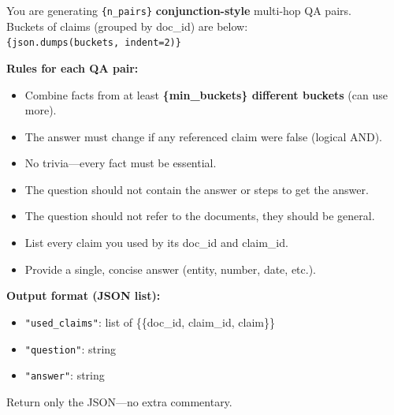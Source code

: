 \begin{tcolorbox}[
    colback=lightgray!20, 
    colframe=gray, 
    title={\textbf{Conjunction-Style Multi-Hop QA Prompt}}, 
    fonttitle=\bfseries,
    sharp corners=southwest,
    coltitle=black,
    label=prompt:p6
]
\small

You are generating \texttt{\{n\_pairs\}} \textbf{conjunction-style} multi-hop QA pairs. \\
Buckets of claims (grouped by doc\_id) are below: \\
\texttt{\{json.dumps(buckets, indent=2)\}}

\vspace{0.2cm}
\textbf{Rules for each QA pair:}
\begin{itemize}
    \item Combine facts from at least \textbf{\{min\_buckets\} different buckets} (can use more).
    \item The answer must change if any referenced claim were false (logical AND).
    \item No trivia—every fact must be essential.
    \item The question should not contain the answer or steps to get the answer.
    \item The question should not refer to the documents, they should be general.
    \item List every claim you used by its doc\_id and claim\_id.
    \item Provide a single, concise answer (entity, number, date, etc.).
\end{itemize}

\vspace{0.2cm}
\textbf{Output format (JSON list):}
\begin{itemize}
    \item \texttt{"used\_claims"}: list of \{\{doc\_id, claim\_id, claim\}\}
    \item \texttt{"question"}: string
    \item \texttt{"answer"}: string
\end{itemize}

Return only the JSON—no extra commentary.

\end{tcolorbox}
